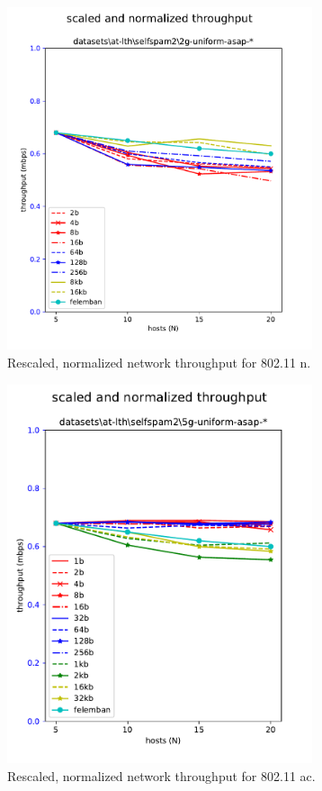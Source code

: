 \begin{figure}[tbp]
  \centering
  \includegraphics[width=0.8\textwidth]{images/rescaled_u_2g.pdf}
  \caption{Rescaled, normalized network throughput for 802.11 n.}
  \label{fig:rescaled_tput_2g}
\end{figure}

\begin{figure}[tbp]
  \centering
  \includegraphics[width=0.8\textwidth]{images/rescaled_u.pdf}
  \caption{Rescaled, normalized network throughput for 802.11 ac.}
  \label{fig:rescaled_tput_5g}
\end{figure}

